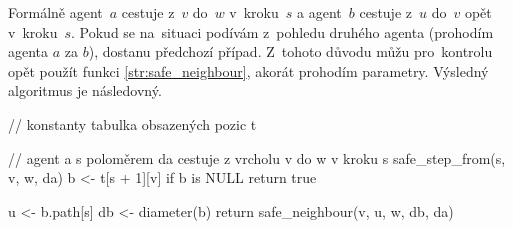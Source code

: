 Formálně agent~$a$ cestuje z~$v$ do~$w$ v~kroku~$s$ a agent~$b$ cestuje z~$u$ do~$v$ opět v~kroku~$s$.
Pokud se na~situaci podívám z~pohledu druhého agenta (prohodím agenta $a$ za $b$), dostanu předchozí případ.
Z~tohoto důvodu můžu pro~kontrolu opět použít funkci \ref{str:safe_neighbour}, akorát prohodím parametry.
Výsledný algoritmus je následovný.

\begin{code}[fontsize=\footnotesize]
// konstanty tabulka obsazených pozic t

// agent a s poloměrem da cestuje z vrcholu v do w v kroku s
safe_step_from(s, v, w, da)
  b <- t[s + 1][v]
  if b is NULL
    return true

  u <- b.path[s]
  db <- diameter(b)
  return safe_neighbour(v, u, w, db, da)
\end{code}
